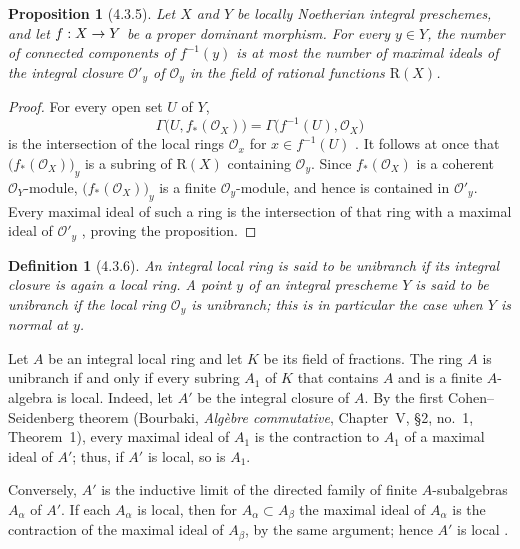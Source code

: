 \documentclass[oneside]{amsart}
\theoremstyle{ega-env-style}
\theoremstyle{ega-thm-env-style}
\newtheorem*{proposition}{Proposition}
\theoremstyle{ega-defn-env-style}
\newtheorem*{definition}{Definition}
\def\mathcal{\mathscr}
\def\sh{\mathcal}                   %
\renewcommand{\to}{\mathchoice{\longrightarrow}{\rightarrow}{\rightarrow}{\rightarrow}}
\newcommand{\oldpage}[2][]{{\marginnote{\normalfont{\textbf{#1}~|~#2}}}\ignorespaces}
\let\EGAOriginalLabel\label
\renewcommand{\label}[1]{\phantomsection\EGAOriginalLabel{#1}}
\begin{document}
\begin{proposition}[4.3.5]
\label{III.4.3.5}
Let $X$ and $Y$ be locally Noetherian integral preschemes, and let
$f:X\to Y$ be a proper dominant morphism.  For every $y\in Y$, the
number of connected components of $f^{-1}(y)$ is at most the number
of maximal ideals of the integral closure $\sh{O}'_y$ of
$\sh{O}_y$ in the field of rational functions $\mathrm{R}(X)$.
\end{proposition}

\begin{proof}
For every open set $U$ of $Y$,
\[
  \Gamma\bigl(U,f_*(\sh{O}_X)\bigr)
  =
  \Gamma\bigl(f^{-1}(U),\sh{O}_X\bigr)
\]
is the intersection of the local rings $\sh{O}_x$ for
$x\in f^{-1}(U)$ .  It follows at once that
$\bigl(f_*(\sh{O}_X)\bigr)_y$ is a subring of $\mathrm{R}(X)$ containing
$\sh{O}_y$.  Since $f_*(\sh{O}_X)$ is a coherent
$\sh{O}_Y$-module, $\bigl(f_*(\sh{O}_X)\bigr)_y$ is a finite
$\sh{O}_y$-module, and hence is contained in $\sh{O}'_y$.
Every maximal ideal of such a ring is the intersection of that ring
with a maximal ideal of $\sh{O}'_y$
\cite[vol.~I, pp.~257 and 259]{I-13}, proving the proposition.
\end{proof}

\begin{definition}[4.3.6]
\label{III.4.3.6}
An integral local ring is said to be \emph{unibranch} if its integral
closure is again a local ring.  A point $y$ of an integral prescheme
$Y$ is said to be \emph{unibranch} if the local ring $\sh{O}_y$ is
unibranch; this is in particular the case when $Y$ is normal at
$y$.
\end{definition}

Let $A$ be an integral local ring and let $K$ be its field of
fractions.  The ring $A$ is unibranch if and only if every subring
$A_1$ of $K$ that contains $A$ and is a finite $A$-algebra is
local.  Indeed, let $A'$ be the integral closure of $A$.  By the
first Cohen--Seidenberg theorem (Bourbaki, \emph{Alg\`ebre
commutative}, Chapter~V, \S2, no.~1, Theorem~1), every maximal ideal
of $A_1$ is the contraction to $A_1$ of a maximal ideal of $A'$;
thus, if $A'$ is local, so is $A_1$.

\oldpage[III]{133}

Conversely, $A'$ is the inductive limit of the directed family of
finite $A$-subalgebras $A_\alpha$ of $A'$.  If each $A_\alpha$ is
local, then for $A_\alpha\subset A_\beta$ the maximal ideal of
$A_\alpha$ is the contraction of the maximal ideal of $A_\beta$, by
the same argument; hence $A'$ is local
.
\end{document}
